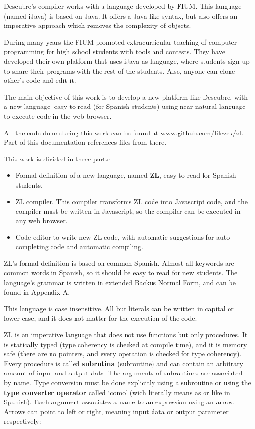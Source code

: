\documentclass{report}
\begin{document}
	Descubre's compiler works with a language developed by FIUM. This language (named iJava) is based on Java. It offers a Java-like syntax, but also offers an imperative approach which removes the complexity of objects.
	
	During many years the FIUM promoted extracurricular teaching of computer programming for high school students with tools and contests. They have developed their own platform that uses iJava as language, where students sign-up to share their programs with the rest of the students. Also, anyone can clone other's code and edit it.
	
	The main objective of this work is to develop a new platform like Descubre, with a new language, easy to read (for Spanish students) using near natural language to execute code in the web browser.
	
	All the code done during this work can be found at \url{www.github.com/lilezek/zl}. Part of this documentation references files from there. 
	
	This work is divided in three parts:
	
	\begin{itemize}
		\item Formal definition of a new language, named \textbf{ZL}, easy to read for Spanish students.
		\item ZL compiler. This compiler transforms ZL code into Javascript code, and the compiler must be written in Javascript, so the compiler can be executed in any web browser.
		\item Code editor to write new ZL code, with automatic suggestions for auto-completing code and automatic compiling.
	\end{itemize} 
	
	ZL's formal definition is based on common Spanish. Almost all keywords are common words in Spanish, so it should be easy to read for new students. The language's grammar is written in extended Backus Normal Form, and can be found in \hyperref[app:a]{Appendix A}.
	
	This language is case insensitive. All but literals can be written in capital or lower case, and it does not matter for the execution of the code. 
	
	ZL is an imperative language that does not use functions but only procedures. It is statically typed (type coherency is checked at compile time), and it is memory safe (there are no pointers, and every operation is checked for type coherency). Every procedure is called \textbf{subrutina} (subroutine) and can contain an arbitrary amount of input and output data. The arguments of subroutines are associated by name. Type conversion must be done explicitly using a subroutine or using the \textbf{type converter operator} called `como' (wich literally means as or like in Spanish). Each argument associates a name to an expression using an arrow. Arrows can point to left or right, meaning input data or output parameter respectively: 
	
\end{document}
